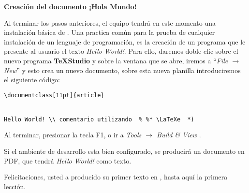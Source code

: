 \textbf{Creación del documento ¡Hola Mundo!}

Al terminar los pasos anteriores, el equipo tendrá en este momento una instalación básica de \LaTeXe. Una practica común para la prueba de cualquier instalación de un lenguaje de programación, es la creación de un programa que le presente al usuario el texto \emph{Hello World!}. Para ello, daremos doble clic sobre el nuevo programa \textbf{\TeX Studio} y sobre la ventana que se abre, iremos a ``\emph{File $ \rightarrow $ New}'' y esto crea un nuevo documento, sobre esta nueva planilla introduciremos el siguiente código:


\begin{lstlisting}
\documentclass[11pt]{article} 


Hello World! \\ comentario utilizando  % %* \LaTeXe  *)

\end{lstlisting}

Al terminar, presionar la tecla F1, o ir a \emph{Tools $\rightarrow$ Build \& View }. 

Si el ambiente de desarrollo esta bien configurado, se  producirá un documento en PDF, que tendrá \emph{Hello World!} como texto.

Felicitaciones, usted a producido su primer texto en \LaTeXe{}, hasta aquí la primera lección. 